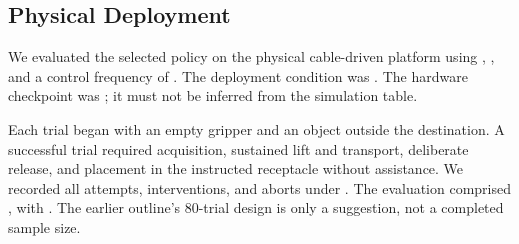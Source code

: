 \subsection{Physical Deployment}
We evaluated the selected policy on the physical cable-driven platform using , , and a control frequency of . The deployment condition was . The hardware checkpoint was ; it must not be inferred from the simulation table.

Each trial began with an empty gripper and an object outside the destination. A successful trial required acquisition, sustained lift and transport, deliberate release, and placement in the instructed receptacle without assistance. We recorded all attempts, interventions, and aborts under . The evaluation comprised , with . The earlier outline's 80-trial design is only a suggestion, not a completed sample size.
